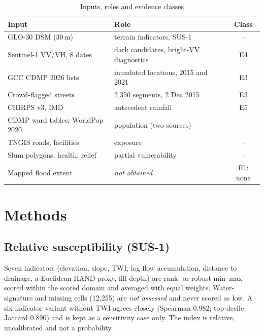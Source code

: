 \documentclass[conference]{IEEEtran}
\begin{document}
\begin{table}[t]
\caption{Inputs, roles and evidence classes}
\label{tab:data}
\centering\footnotesize
\begin{tabular}{@{}p{2.6cm}p{3.3cm}c@{}}
\toprule
Input & Role & Class \\
\midrule
GLO-30 DSM (30\,m) & terrain indicators, SUS-1 & -- \\
Sentinel-1 VV/VH, 8 dates & dark candidates, bright-VV diagnostics & E4 \\
GCC CDMP 2026 lists \cite{gcc2026cdmp} & inundated locations, 2015 and 2021 & E3 \\
Crowd-flagged streets & 2,350 segments, 2 Dec 2015 & E3 \\
CHIRPS v3, IMD & antecedent rainfall & E5 \\
CDMP ward tables; WorldPop 2020 \cite{tatem2017worldpop} & population (two sources) & -- \\
TNGIS roads, facilities & exposure & -- \\
Slum polygons; health; relief & partial vulnerability & -- \\
\midrule
Mapped flood extent & \emph{not obtained} & E1: none \\
\bottomrule
\end{tabular}
\end{table}

\section{Methods}
\subsection{Relative susceptibility (SUS-1)}
Seven indicators (elevation, slope, TWI, log flow accumulation, distance to drainage, a Euclidean HAND proxy, fill depth) are rank- or robust-min--max scored within the scored domain and averaged with equal weights. Water-signature and missing cells (12{,}255) are \emph{not assessed} and never scored as low. A six-indicator variant without TWI agrees closely (Spearman 0.982; top-decile Jaccard 0.890) and is kept as a sensitivity case only. The index is relative, uncalibrated and not a probability.
\end{document}
